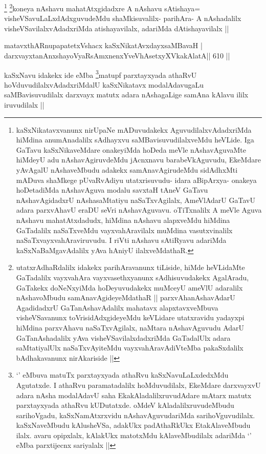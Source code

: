 \begin{artha}
\footnote{kaSxNikatavxvanunx nirUpaNe mADuvudakekx AguvudilalxvAdadxriMda hiMdina anumAnadalilx sAdhayxvu saMBavisuvudilalxveMdu heVLide. Iga GaTavu kaSxNikaveMdare onakeyiMda hoDeda meVle nAshavAguvaMte hiMdeyU adu nAshavAgiruvdeMdu jAcnxnavu barabeVkAguvudu, EkeMdare yAvAgalU nAshaveMbudu adakekx samAnavAgirudeMdu sidAdhxMti mADuva shaMkege pUvaRvAdiyu utatxrisuvudu- idara aBipArxya- onakeya hoDetadiMda nAshavAguva modalu savxtaH tAneV GaTavu nAshavAgidadxrU nAshasaMtatiyu naSaTxvAgilalx, AmeVlAdarU GaTavU adara parxvAhavU eraDU seVri nAshavAguvavu. oTiTxnalilx A meVle Aguva nAshavu mahatAtxdadudx, hiMdina nAshavu alapxveMdu hiMdina GaTadalilx naSaTxveMdu vayxvahAravilalx muMdina vasutxvinalilx naSaTxvayxvahAraviruvudu. I riVti nAshavu sAtiRyavu adariMda kaSxNaBaMgavAdalilx yAva hAniyU ilalxveMdathaR.}
\footnote{utatxrAdhaRdalilx idakekx parihAravanunx tiLiside, hiMde heVLidaMte GaTadalilx vayxvahAra vayxvasethxyanunx sAdhisuvudakekx AgalAradu, GaTakekx doNeNxyiMda hoDeyuvudakekx muMceyU ameVlU adaralilx nAshavoMbudu samAnavAgideyeMdathaR || parxvAhanAshavAdarU AgadidadxrU GaTanAshavAdalilx mahatavx alapxtavxveMbuva visheVSavanunx toVrisidAdxgideyeMdu keVLidare utatxravidu yadayxpi hiMdina parxvAhavu naSaTxvAgilalx, naMtara nAshavAguvudu AdarU GaTanAshadalilx yAva visheVSavilalxdadxriMda GaTadalUlx adara saMtatiyalUlx naSaTxvAyiteMdu vayxvahAravAdiVteMba pakaSxdalilx bAdhakavanunx nirAkariside ||}koneya nAshavu mahatAtxgidadxre A nAshavu sAtishaya= visheVSavuLaLxdAdxguvudeMdu shaMkisuvalilx- parihAra- A nAshadalilx visheVSavilalxvAdadxriMda atishayavilalx, adariMda dAtishayavilalx ||
\end{artha}


\begin{shl}
matavxthARnupapatetxVshacx kaSxNikatAvxdayxsaMBavaH | \\
darxvayxtanAnxshayoVyaRsAmxnenxYveVhAsetxyXVkakAlatA\hfill ||  610 ||  
\end{shl}

\begin{artha}
kaSxNavu idakekx ide eMba \footnote{`\stext' eMbuva matuTx parxtayxyada athaRvu kaSxNavuLaLxdedxMdu Agutatxde. I athaRvu paramatadalilx hoMduvudilalx, EkeMdare darxvayxvU adara nAsha modalAdavU saha EkakAladalilxruvudAdare mAtarx matutx parxtayxyada athaRvu kUDutatxde. oMdeV kAladalilxruvudeMbudu sarihoVgadu, kaSxNamAtxrxvidu nAshavAguvudariMda sarihoVguvudilalx. kaSxNaveMbudu kAlusheVSa, adakUkx padAthaRkUkx EtakAlaveMbudu ilalx. avaru opipxlalx, kAlakUkx matotxMdu kAlaveMbudilalx adariMda `\stext' eMba parxtijecnx sariyalalx ||}matupf parxtayxyada athaRvU hoVduvudilalxvAdadxriMdalU kaSxNikatavx modalAdavugaLu saMBavisuvudilalx darxvayx matutx adara nAshagaLige samAna kAlavu ililx iruvudilalx ||
\end{artha}

